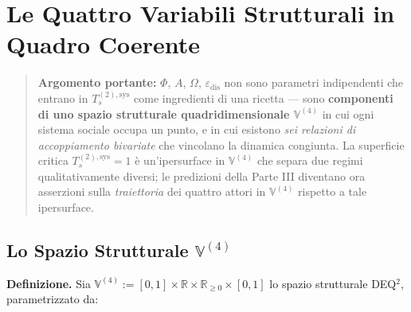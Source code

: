 \chapter{Le Quattro Variabili Strutturali in Quadro
Coerente}\label{le-quattro-variabili-strutturali-in-quadro-coerente}

\begin{quote}
\textbf{Argomento portante:} \(\Phi\), \(A\), \(\Omega\),
\(\varepsilon_{\text{dis}}\) non sono parametri indipendenti che entrano
in \(T_s^{(2),\text{sys}}\) come ingredienti di una ricetta --- sono
\textbf{componenti di uno spazio strutturale quadridimensionale
\(\mathbb{V}^{(4)}\)} in cui ogni sistema sociale occupa un punto, e in
cui esistono \emph{sei relazioni di accoppiamento bivariate} che
vincolano la dinamica congiunta. La superficie critica
\(T_s^{(2),\text{sys}} = 1\) è un'ipersurface in \(\mathbb{V}^{(4)}\)
che separa due regimi qualitativamente diversi; le predizioni della
Parte III diventano ora asserzioni sulla \emph{traiettoria} dei quattro
attori in \(\mathbb{V}^{(4)}\) rispetto a tale ipersurface.
\end{quote}



\section{\texorpdfstring{Lo Spazio Strutturale
\(\mathbb{V}^{(4)}\)}{Lo Spazio Strutturale \textbackslash mathbb\{V\}\^{}\{(4)\}}}\label{lo-spazio-strutturale-mathbbv4}

\Hypoth{} \textbf{Definizione.} Sia
\(\mathbb{V}^{(4)} := [0, 1] \times \mathbb{R} \times \mathbb{R}_{\geq 0} \times [0, 1]\)
lo spazio strutturale DEQ$^2$, parametrizzato da:

